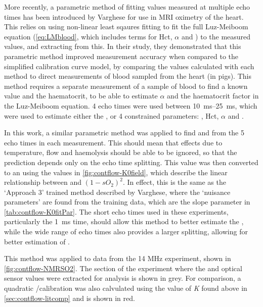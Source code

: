 More recently, a parametric method of fitting \Ttwo values measured at multiple echo times has been introduced by Varghese\cite{VargheseCMRbasedbloodoximetry2017} for use in MRI oximetry of the heart.
This relies on using non-linear least sqaures fitting to fit the full Luz-Meiboom equation (\autoref{eq:LMblood}, which includes terms for Hct, $\alpha$ and \SOtwo) to the measured \Ttwo values, and extracting \SOtwo from this.
In their study, they demonstrated that this parametric method improved \SOtwo measurement accuracy when compared to the simplified calibration curve model, by comparing the \SOtwo values calculated with each method to direct \SOtwo measurements of blood sampled from the heart (in pigs).
This method requires a separate measurement of a sample of blood to find a known \SOtwo value and the haematocrit, to be able to estimate $\alpha$ and the haematocrit factor in the Luz-Meiboom equation.
4 echo times were used between \SIrange{10}{25}{ms}, which were used to estimate either the \SOtwo, or 4 constrained parameters: \SOtwo, Hct, $\alpha$ and \TtwoO.

In this work, a similar parametric method was applied to find \Kzero and \TtwoO from the 5 echo times in each measurement.
This should mean that effects due to temperature, flow and haemolysis should be able to be ignored, so that the \SOtwo prediction depends only on the echo time splitting.
This \Kzero value was then converted to an \SOtwo using the values in \autoref{fig:contflow-K0field}, which describe the linear relationship between \Kzero and $(1-sO_2)^2$.
In effect, this is the same as the `Approach 3' trained method described by Varghese, where the `nuisance parameters' are found from the training data, which are the slope parameter in \autoref{tab:contflow-K0fitPar}.
The short echo times used in these experiments, particularly the \SI{1}{ms} time, should allow this method to better estimate the \TtwoO, while the wide range of echo times also provides a larger splitting, allowing for better estimation of \Kzero.

This method was applied to data from the 14 MHz experiment, shown in \autoref{fig:contflow-NMRSO2}.
The section of the experiment where the \Ttwo and optical sensor \SOtwo values were extracted for analysis is shown in grey.
For comparison, a quadratic \Rtwo/\SOtwo calibration was also calvulated using the value of \textit{K} found above in \autoref{sec:contflow-litcomp} and is shown in red.

